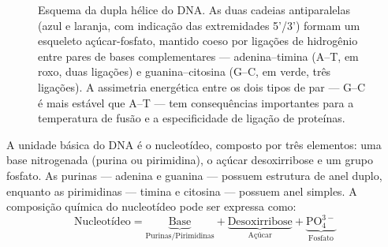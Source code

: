 \begin{figure}[htbp]
\centering
{}
\caption{Esquema da dupla hélice do DNA. As duas cadeias antiparalelas (azul e laranja, com indicação das extremidades 5'/3') formam um esqueleto açúcar-fosfato, mantido coeso por ligações de hidrogênio entre pares de bases complementares --- adenina--timina (A--T, em roxo, duas ligações) e guanina--citosina (G--C, em verde, três ligações). A assimetria energética entre os dois tipos de par --- G--C é mais estável que A--T --- tem consequências importantes para a temperatura de fusão e a especificidade de ligação de proteínas.}
\label{fig:01-dna}
\end{figure}

\begin{definicaoenv}[Nucleotídeo]
A unidade básica do DNA é o nucleotídeo, composto por três elementos: uma base nitrogenada
(purina ou pirimidina), o açúcar desoxirribose e um grupo fosfato. As purinas --- adenina
e guanina --- possuem estrutura de anel duplo, enquanto as pirimidinas --- timina e
citosina --- possuem anel simples. A composição química do nucleotídeo pode ser expressa
como:
\begin{equation}
\text{Nucleotídeo} = \underbrace{\text{Base}}_{\text{Purinas/Pirimidinas}}
                   + \underbrace{\text{Desoxirribose}}_{\text{Açúcar}}
                   + \underbrace{\text{PO}_4^{3-}}_{\text{Fosfato}}
\end{equation}
\end{definicaoenv}

